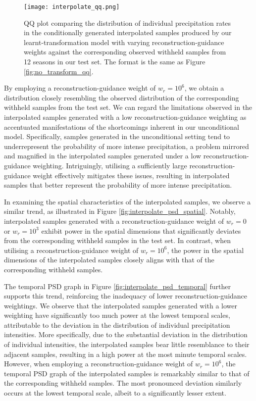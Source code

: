 \documentclass[ oneside,%
                    author={George Herbert},
                    degree={MSci},
                     title={Diffusion Models for Time-Evolving Precipitation Fields},
                  subtitle={}]{dissertation}
\begin{document}
\begin{figure}[htbp]
      \centering
      \texttt{[image: interpolate\_qq.png]}
      \caption{QQ plot comparing the distribution of individual precipitation rates in the conditionally generated interpolated samples produced by our learnt-transformation model with varying reconstruction-guidance weights against the corresponding observed withheld samples from 12 seasons in our test set. The format is the same as Figure \ref{fig:no_transform_qq}.}
      \label{fig:interpolate_qq}
\end{figure}

By employing a reconstruction-guidance weight of $w_r=10^6$, we obtain a distribution closely resembling the observed distribution of the corresponding withheld samples from the test set. We can regard the limitations observed in the interpolated samples generated with a low reconstruction-guidance weighting as accentuated manifestations of the shortcomings inherent in our unconditional model. Specifically, samples generated in the unconditional setting tend to underrepresent the probability of more intense precipitation, a problem mirrored and magnified in the interpolated samples generated under a low reconstruction-guidance weighting. Intriguingly, utilising a sufficiently large reconstruction-guidance weight effectively mitigates these issues, resulting in interpolated samples that better represent the probability of more intense precipitation.

In examining the spatial characteristics of the interpolated samples, we observe a similar trend, as illustrated in Figure \ref{fig:interpolate_psd_spatial}. Notably, interpolated samples generated with a reconstruction-guidance weight of $w_r=0$ or $w_r=10^3$ exhibit power in the spatial dimensions that significantly deviates from the corresponding withheld samples in the test set. In contrast, when utilising a reconstruction-guidance weight of $w_r=10^6$, the power in the spatial dimensions of the interpolated samples closely aligns with that of the corresponding withheld samples.

The temporal PSD graph in Figure \ref{fig:interpolate_psd_temporal} further supports this trend, reinforcing the inadequacy of lower reconstruction-guidance weightings. We observe that the interpolated samples generated with a lower weighting have significantly too much power at the lowest temporal scales, attributable to the deviation in the distribution of individual precipitation intensities. More specifically, due to the substantial deviation in the distribution of individual intensities, the interpolated samples bear little resemblance to their adjacent samples, resulting in a high power at the most minute temporal scales. However, when employing a reconstruction-guidance weight of $w_r=10^6$, the temporal PSD graph of the interpolated samples is remarkably similar to that of the corresponding withheld samples. The most pronounced deviation similarly occurs at the lowest temporal scale, albeit to a significantly lesser extent.
\end{document}
